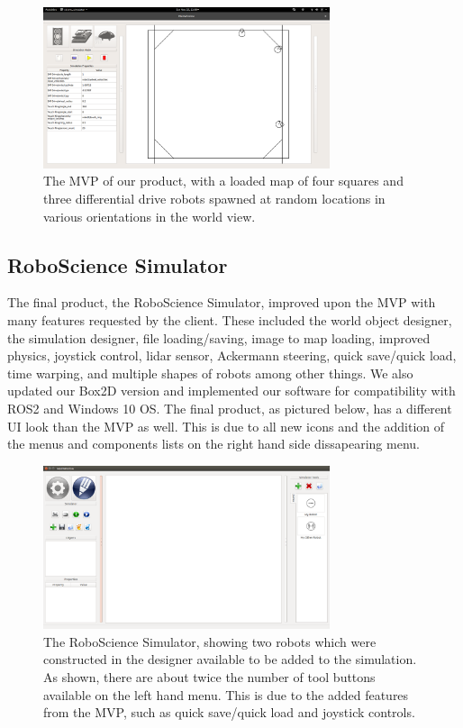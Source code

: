 \begin{figure}[!htb]
	\begin{center}
		\includegraphics[width=0.75\textwidth]{./Images/Sprint3_hasBox_originalUI}
	\end{center}
	\caption{The MVP of our product, with a loaded map of four squares and three differential drive robots spawned at random locations in various orientations in the world view. \label{mvp}}
\end{figure}


\subsection{RoboScience Simulator}

The final product, the RoboScience Simulator, improved upon the MVP with many features requested by the client. These included the world object designer, the simulation designer, file loading/saving, image to map loading, improved physics, joystick control, lidar sensor, Ackermann steering, quick save/quick load, time warping, and multiple shapes of robots among other things. We also updated our Box2D version and implemented our software for compatibility with ROS2 and Windows 10 OS. The final product, as pictured below, has a different UI look than the MVP as well. This is due to all new icons and the addition of the menus and components lists on the right hand side dissapearing menu. 

\begin{figure}[!htb]
	\begin{center}
		\includegraphics[width=0.75\textwidth]{./Images/simulator_with_my_robots}
	\end{center}
	\caption{The RoboScience Simulator, showing two robots which were constructed in the designer available to be added to the simulation. As shown, there are about twice the number of tool buttons available on the left hand menu. This is due to the added features from the MVP, such as quick save/quick load and joystick controls. \label{mvp}}
\end{figure}

